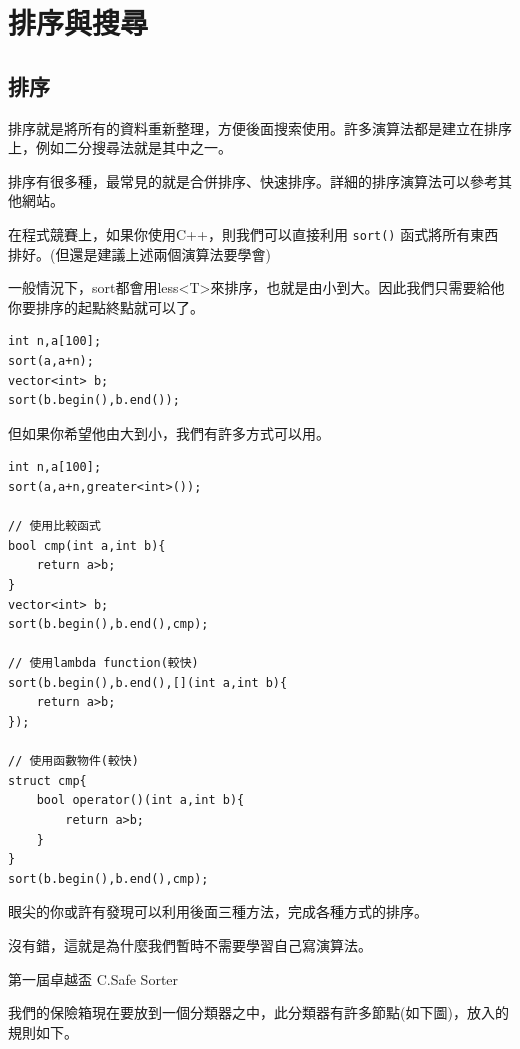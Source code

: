 \section{排序與搜尋}

    \subsection{排序}
    \author{ShangJhe Li}
    排序就是將所有的資料重新整理，方便後面搜索使用。許多演算法都是建立在排序上，例如二分搜尋法就是其中之一。

    排序有很多種，最常見的就是合併排序、快速排序。詳細的排序演算法可以參考其他網站。

    在程式競賽上，如果你使用C++，則我們可以直接利用 \verb|sort()| 函式將所有東西排好。(但還是建議上述兩個演算法要學會)

    一般情況下，sort都會用less<T>來排序，也就是由小到大。因此我們只需要給他你要排序的起點終點就可以了。

\begin{lstlisting}[caption=一般的sort]
int n,a[100];
sort(a,a+n);
vector<int> b;
sort(b.begin(),b.end());

\end{lstlisting}
        
    但如果你希望他由大到小，我們有許多方式可以用。

\begin{lstlisting}[caption=由大到小排]
int n,a[100];
sort(a,a+n,greater<int>());

// 使用比較函式
bool cmp(int a,int b){
    return a>b;
}
vector<int> b;
sort(b.begin(),b.end(),cmp);

// 使用lambda function(較快)
sort(b.begin(),b.end(),[](int a,int b){
    return a>b;
});

// 使用函數物件(較快)
struct cmp{
    bool operator()(int a,int b){
        return a>b;
    }
}
sort(b.begin(),b.end(),cmp);

\end{lstlisting}

    眼尖的你或許有發現可以利用後面三種方法，完成各種方式的排序。

    沒有錯，這就是為什麼我們暫時不需要學習自己寫演算法。

    \example 第一屆卓越盃 C.Safe Sorter

    我們的保險箱現在要放到一個分類器之中，此分類器有許多節點(如下圖)，放入的規則如下。

